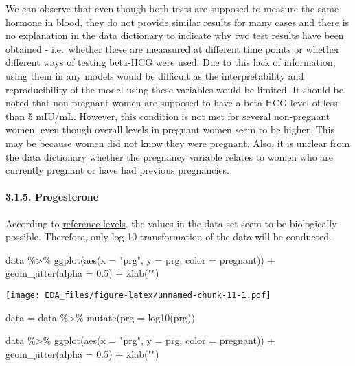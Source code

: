 \documentclass[
]{article}
\newenvironment{Shaded}{\begin{snugshade}}{\end{snugshade}}
\newcommand{\AttributeTok}[1]{\textcolor[rgb]{0.77,0.63,0.00}{#1}}
\newcommand{\FloatTok}[1]{\textcolor[rgb]{0.00,0.00,0.81}{#1}}
\newcommand{\FunctionTok}[1]{\textcolor[rgb]{0.00,0.00,0.00}{#1}}
\newcommand{\NormalTok}[1]{#1}
\newcommand{\OtherTok}[1]{\textcolor[rgb]{0.56,0.35,0.01}{#1}}
\newcommand{\SpecialCharTok}[1]{\textcolor[rgb]{0.00,0.00,0.00}{#1}}
\newcommand{\StringTok}[1]{\textcolor[rgb]{0.31,0.60,0.02}{#1}}
\begin{document}
We can observe that even though both tests are supposed to measure the
same hormone in blood, they do not provide similar results for many
cases and there is no explanation in the data dictionary to indicate why
two test results have been obtained - i.e.~whether these are meaasured
at different time points or whether different ways of testing beta-HCG
were used. Due to this lack of information, using them in any models
would be difficult as the interpretability and reproducibility of the
model using these variables would be limited. It should be noted that
non-pregnant women are supposed to have a beta-HCG level of less than 5
mIU/mL. However, this condition is not met for several non-pregnant
women, even though overall levels in pregnant women seem to be higher.
This may be because women did not know they were pregnant. Also, it is
unclear from the data dictionary whether the pregnancy variable relates
to women who are currently pregnant or have had previous pregnancies.

\hypertarget{progesterone}{%
\paragraph{3.1.5. Progesterone}\label{progesterone}}

According to
\href{https://www.urmc.rochester.edu/encyclopedia/content.aspx?ContentTypeID=167\&ContentID=progesterone}{reference
levels}, the values in the data set seem to be biologically possible.
Therefore, only log-10 transformation of the data will be conducted.

\begin{Shaded}
\begin{Highlighting}[]
\NormalTok{data }\SpecialCharTok{\%\textgreater{}\%} 
  \FunctionTok{ggplot}\NormalTok{(}\FunctionTok{aes}\NormalTok{(}\AttributeTok{x =} \StringTok{"prg"}\NormalTok{, }\AttributeTok{y =}\NormalTok{ prg, }\AttributeTok{color =}\NormalTok{ pregnant)) }\SpecialCharTok{+}
  \FunctionTok{geom\_jitter}\NormalTok{(}\AttributeTok{alpha =} \FloatTok{0.5}\NormalTok{) }\SpecialCharTok{+}
  \FunctionTok{xlab}\NormalTok{(}\StringTok{""}\NormalTok{)}
\end{Highlighting}
\end{Shaded}

\texttt{[image: EDA\_files/figure-latex/unnamed-chunk-11-1.pdf]}

\begin{Shaded}
\begin{Highlighting}[]
\NormalTok{data }\OtherTok{=}\NormalTok{ data }\SpecialCharTok{\%\textgreater{}\%} 
  \FunctionTok{mutate}\NormalTok{(}\AttributeTok{prg =} \FunctionTok{log10}\NormalTok{(prg)) }

\NormalTok{data }\SpecialCharTok{\%\textgreater{}\%} 
  \FunctionTok{ggplot}\NormalTok{(}\FunctionTok{aes}\NormalTok{(}\AttributeTok{x =} \StringTok{"prg"}\NormalTok{, }\AttributeTok{y =}\NormalTok{ prg, }\AttributeTok{color =}\NormalTok{ pregnant)) }\SpecialCharTok{+}
  \FunctionTok{geom\_jitter}\NormalTok{(}\AttributeTok{alpha =} \FloatTok{0.5}\NormalTok{) }\SpecialCharTok{+}
  \FunctionTok{xlab}\NormalTok{(}\StringTok{""}\NormalTok{)}
\end{Highlighting}
\end{Shaded}
\end{document}
